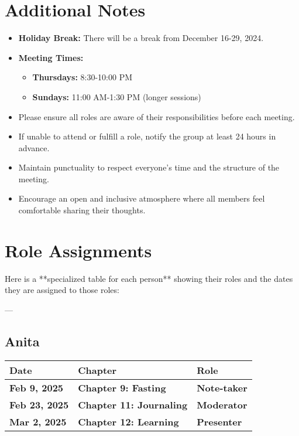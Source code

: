 \documentclass[10pt]{article}
\begin{document}
\section*{Additional Notes}
\begin{itemize}
    \item \textbf{Holiday Break:} There will be a break from December 16-29, 2024.
    \item \textbf{Meeting Times:}
    \begin{itemize}
        \item \textbf{Thursdays:} 8:30-10:00 PM
        \item \textbf{Sundays:} 11:00 AM-1:30 PM (longer sessions)
    \end{itemize}
    \item Please ensure all roles are aware of their responsibilities before each meeting.
    \item If unable to attend or fulfill a role, notify the group at least 24 hours in advance.
    \item Maintain punctuality to respect everyone's time and the structure of the meeting.
    \item Encourage an open and inclusive atmosphere where all members feel comfortable sharing their thoughts.
\end{itemize}

\newpage
\section*{Role Assignments}
Here is a **specialized table for each person** showing their roles and the dates they are assigned to those roles:

---

\subsection*{Anita}
\begin{tcolorbox}[colframe=blue!40, colback=yellow!10, coltitle=black, sharp corners=south, boxrule=0.4mm, width=\textwidth-2mm]
\renewcommand{\arraystretch}{1.5} %
\begin{longtable}{|@{}p{2.5cm}|@{}p{3.5cm}|@{}p{2.5cm}|}
\hline
\textbf{Date} & \textbf{Chapter} & \textbf{Role} \\
\hline
\endhead
\hline
\endlastfoot
\textbf{Feb 9, 2025} & \textbf{Chapter 9: Fasting} & \textbf{Note-taker} \\
\hline
\textbf{Feb 23, 2025} & \textbf{Chapter 11: Journaling} & \textbf{Moderator} \\
\hline
\textbf{Mar 2, 2025} & \textbf{Chapter 12: Learning} & \textbf{Presenter} \\
\hline
\end{longtable}
\end{tcolorbox}
\end{document}
